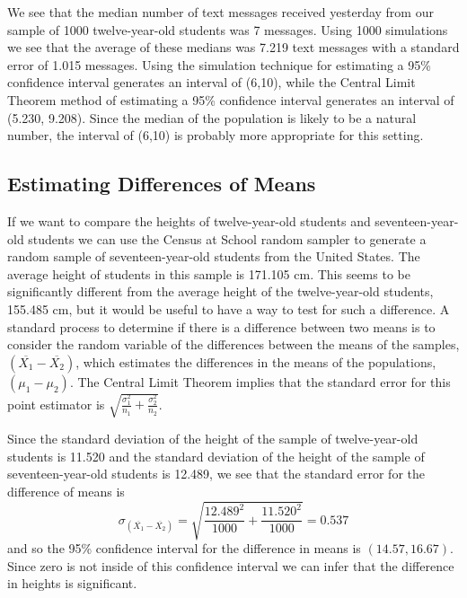 \documentclass[
]{book}
\theoremstyle{definition}
\theoremstyle{definition}
\theoremstyle{definition}
\theoremstyle{definition}
\theoremstyle{remark}
\begin{document}
We see that the median number of text messages received yesterday from our sample of 1000 twelve-year-old students was 7 messages. Using 1000 simulations we see that the average of these medians was 7.219 text messages with a standard error of 1.015 messages. Using the simulation technique for estimating a 95\% confidence interval generates an interval of (6,10), while the Central Limit Theorem method of estimating a 95\% confidence interval generates an interval of (5.230, 9.208). Since the median of the population is likely to be a natural number, the interval of (6,10) is probably more appropriate for this setting.

\hypertarget{estimating-differences-of-means}{%
\subsection{Estimating Differences of Means}\label{estimating-differences-of-means}}

If we want to compare the heights of twelve-year-old students and seventeen-year-old students we can use the Census at School random sampler to generate a random sample of seventeen-year-old students from the United States. The average height of students in this sample is 171.105 cm. This seems to be significantly different from the average height of the twelve-year-old students, 155.485 cm, but it would be useful to have a way to test for such a difference. A standard process to determine if there is a difference between two means is to consider the random variable of the differences between the means of the samples, \((\overline{X_1} - \overline{X_2})\), which estimates the differences in the means of the populations, \((\mu_1-\mu_2)\). The Central Limit Theorem implies that the standard error for this point estimator is \(\displaystyle{\sqrt{ \frac{\sigma_1^2}{n_1} + \frac{\sigma_2^2}{n_2}}}\).

Since the standard deviation of the height of the sample of twelve-year-old students is 11.520 and the standard deviation of the height of the sample of seventeen-year-old students is 12.489, we see that the standard error for the difference of means is
\[\sigma_{(\overline{X_1}-\overline{X_2})} =  \sqrt{\frac{12.489^2}{1000} + \frac{11.520^2}{1000} } = 0.537\] and so the 95\% confidence interval for the difference in means is \((14.57, 16.67)\). Since zero is not inside of this confidence interval we can infer that the difference in heights is significant.
\end{document}
